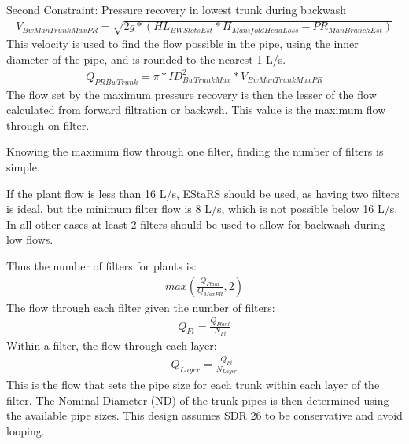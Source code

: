 \documentclass[letterpaper,10pt,english]{sphinxmanual}
\begin{document}
Second Constraint: Pressure recovery in lowest trunk during backwash
\begin{equation}\label{equation:Filtration/Filtration_Derivations:Filtration/Filtration_Derivations:8}
\begin{split}V_{BwManTrunkMaxPR} = \sqrt{2g*(HL_{BWSlotsEst}*\Pi_{ManifoldHeadLoss} - PR_{ManBranchEst} )}\end{split}
\end{equation}
This velocity is used to find the flow possible in the pipe, using the inner diameter of the pipe, and is rounded to the nearest 1 L/s.
\begin{equation}\label{equation:Filtration/Filtration_Derivations:Filtration/Filtration_Derivations:9}
\begin{split}Q_{PRBwTrunk} = \pi*ID_{BwTrunkMax}^2 * V_{BwManTrunkMaxPR}\end{split}
\end{equation}
The flow set by the maximum pressure recovery is then the lesser of the flow calculated from forward filtration or backwsh. This value is the maximum flow through on filter.

Knowing the maximum flow through one filter, finding the number of filters is simple.

If the plant flow is less than 16 L/s, EStaRS should be used, as having two filters is ideal, but the minimum filter flow is 8 L/s, which is not possible below 16 L/s.
In all other cases at least 2 filters should be used to allow for backwash during low flows.

Thus the number of filters for plants is:
\begin{equation}\label{equation:Filtration/Filtration_Derivations:Filtration/Filtration_Derivations:10}
\begin{split}max(\frac{Q_{Plant}}{Q_{MaxPR}}, 2)\end{split}
\end{equation}
The flow through each filter given the number of filters:
\begin{equation}\label{equation:Filtration/Filtration_Derivations:Filtration/Filtration_Derivations:11}
\begin{split}Q_{Fi} = \frac{Q_{Plant}}{N_{Fi}}\end{split}
\end{equation}
Within a filter, the flow through each layer:
\begin{equation}\label{equation:Filtration/Filtration_Derivations:Filtration/Filtration_Derivations:12}
\begin{split}Q_{Layer} = \frac{Q_{Fi}}{N_{Layer}}\end{split}
\end{equation}
This is the flow that sets the pipe size for each trunk within each layer of the filter. The Nominal Diameter (ND) of the trunk pipes is then determined using the available pipe sizes. This design assumes SDR 26 to be conservative and avoid looping.
\end{document}
